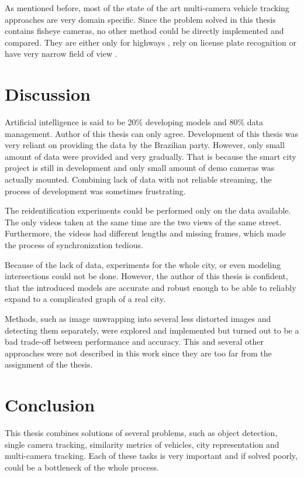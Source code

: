 \documentclass[a4paper,11pt,titlepage,twoside]{article}
\numberwithin{figure}{section}
\begin{document}
As mentioned before, most of the state of the art multi-camera vehicle tracking approaches are very domain specific. Since the problem solved in this thesis contains fisheye cameras, no other method could be directly implemented and compared. They are either only for highways \cite{coifman2007vehicle, kuhne1991freeway}, rely on license plate recognition \cite{arth2007real, du2013automatic} or have very narrow field of view \cite{matei2011vehicle}.

\clearpage
\section{Discussion}
Artificial intelligence is said to be 20\% developing models and 80\% data management. Author of this thesis can only agree. Development of this thesis was very reliant on providing the data by the Brazilian party. However, only small amount of data were provided and very gradually. That is because the smart city project is still in development and only small amount of demo cameras was actually mounted. Combining lack of data with not reliable streaming, the process of development was sometimes frustrating. 

The reidentification experiments could be performed only on the data available. The only videos taken at the same time are the two views of the same street. Furthermore, the videos had different lengths and missing frames, which made the process of synchronization tedious. 

Because of the lack of data, experiments for the whole city, or even modeling intersections could not be done. However, the author of this thesis is confident, that the introduced models are accurate and robust enough to be able to reliably expand to a complicated graph of a real city.

Methods, such as image unwrapping into several less distorted images and detecting them separately, were explored and implemented but turned out to be a bad trade-off between performance and accuracy. This and several other approaches were not described in this work since they are too far from the assignment of the thesis.

\clearpage
\section{Conclusion}
This thesis combines solutions of several problems, such as object detection, single camera tracking, similarity metrics of vehicles, city representation and multi-camera tracking. Each of these tasks is very important and if solved poorly, could be a bottleneck of the whole process.
\end{document}
